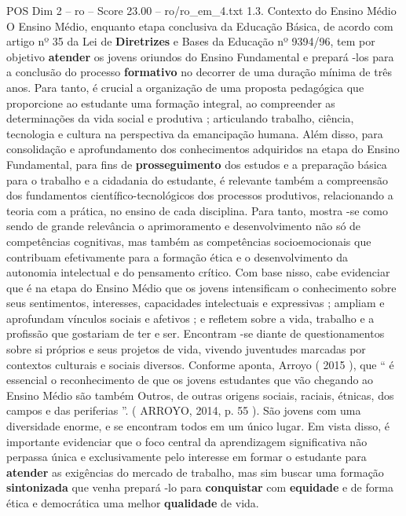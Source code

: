 \begin{textsample}{POS Dim 2 – ro – Score 23.00 – ro/ro\_em\_4.txt}  \label{ex:f2_pos_190}
1.3.
Contexto do Ensino Médio O Ensino Médio, enquanto etapa conclusiva da Educação Básica, de acordo com artigo nº 35 da Lei de \textbf{Diretrizes} e Bases da Educação nº 9394/96, tem por objetivo \textbf{atender} os jovens oriundos do Ensino Fundamental e prepará -los para a conclusão do processo \textbf{formativo} no decorrer de uma duração mínima de três anos.
Para tanto, é crucial a organização de uma proposta pedagógica que proporcione ao estudante uma formação integral, ao compreender as determinações da vida social e produtiva ; articulando trabalho, ciência, tecnologia e cultura na perspectiva da emancipação humana.
Além disso, para consolidação e aprofundamento dos conhecimentos adquiridos na etapa do Ensino Fundamental, para fins de \textbf{prosseguimento} dos estudos e a preparação básica para o trabalho e a cidadania do estudante, é relevante também a compreensão dos fundamentos científico-tecnológicos dos processos produtivos, relacionando a teoria com a prática, no ensino de cada disciplina.
Para tanto, mostra -se como sendo de grande relevância o aprimoramento e desenvolvimento não só de competências cognitivas, mas também as competências socioemocionais que contribuam efetivamente para a formação ética e o desenvolvimento da autonomia intelectual e do pensamento crítico.
Com base nisso, cabe evidenciar que é na etapa do Ensino Médio que os jovens intensificam o conhecimento sobre seus sentimentos, interesses, capacidades intelectuais e expressivas ; ampliam e aprofundam vínculos sociais e afetivos ; e refletem sobre a vida, trabalho e a profissão que gostariam de ter e ser.
Encontram -se diante de questionamentos sobre si próprios e seus projetos de vida, vivendo juventudes marcadas por contextos culturais e sociais diversos.
Conforme aponta, Arroyo ( 2015 ), que “ é essencial o reconhecimento de que os jovens estudantes que vão chegando ao Ensino Médio são também Outros, de outras origens sociais, raciais, étnicas, dos campos e das periferias ”. ( ARROYO, 2014, p. 55 ).
São jovens com uma diversidade enorme, e se encontram todos em um único lugar.
Em vista disso, é importante evidenciar que o foco central da aprendizagem significativa não perpassa única e exclusivamente pelo interesse em formar o estudante para \textbf{atender} as exigências do mercado de trabalho, mas sim buscar uma formação \textbf{sintonizada} que venha prepará -lo para \textbf{conquistar} com \textbf{equidade} e de forma ética e democrática uma melhor \textbf{qualidade} de vida.

\end{textsample}
